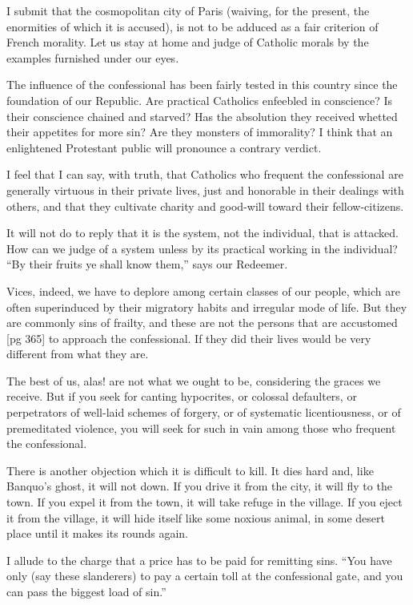 I submit that the cosmopolitan city of Paris
(waiving, for the present, the enormities of which
it is accused), is not to be adduced as a fair criterion
of French morality. Let us stay at home
and judge of Catholic morals by the examples
furnished under our eyes.

The influence of the confessional has been fairly
tested in this country since the foundation of our
Republic. Are practical Catholics enfeebled in
conscience? Is their conscience chained and
starved? Has the absolution they received whetted
their appetites for more sin? Are they monsters
of immorality? I think that an enlightened
Protestant public will pronounce a contrary verdict.

I feel that I can say, with truth, that Catholics
who frequent the confessional are generally
virtuous in their private lives, just and honorable
in their dealings with others, and that they cultivate
charity and good-will toward their fellow-citizens.

It will not do to reply that it is the system, not
the individual, that is attacked. How can we
judge of a system unless by its practical working
in the individual? “By their fruits ye shall know
them,” says our Redeemer.

Vices, indeed, we have to deplore among certain
classes of our people, which are often superinduced
by their migratory habits and irregular
mode of life. But they are commonly sins of
frailty, and these are not the persons that are accustomed
[pg 365]
to approach the confessional. If they
did their lives would be very different from what
they are.

The best of us, alas! are not what we ought to
be, considering the graces we receive. But if you
seek for canting hypocrites, or colossal defaulters,
or perpetrators of well-laid schemes of forgery, or
of systematic licentiousness, or of premeditated
violence, you will seek for such in vain among
those who frequent the confessional.

There is another objection which it is difficult to
kill. It dies hard and, like Banquo's ghost, it will
not down. If you drive it from the city, it will fly
to the town. If you expel it from the town, it will
take refuge in the village. If you eject it from the
village, it will hide itself like some noxious animal,
in some desert place until it makes its rounds again.

I allude to the charge that a price has to be paid
for remitting sins. “You have only (say these
slanderers) to pay a certain toll at the confessional
gate, and you can pass the biggest load of sin.”

